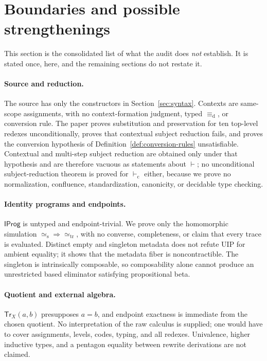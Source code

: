 \documentclass[10pt,reqno]{amsart}
\newcommand{\Tr}{\mathsf{Tr}}
\newcommand{\TrEq}{\mathrel{\simeq_{\mathrm{tr}}}}
\newcommand{\IProg}{\mathsf{IProg}}
\newcommand{\defeq}{\mathrel{\equiv_{\mathrm d}}}
\newcommand{\vdashC}{\vdash_{\mathrm{c}}}
\newcommand{\srweq}{\mathrel{\simeq_{\mathrm s}}}
\begin{document}
\section{Boundaries and possible strengthenings}
\label{sec:limitations}

This section is the consolidated list of what the audit does \emph{not}
establish.  It is stated once, here, and the remaining sections do not restate
it.

\paragraph{Source and reduction.}
The source has only the constructors in Section~\ref{sec:syntax}.  Contexts
are same-scope assignments, with no context-formation judgment, typed
\(\defeq\), or conversion rule.  The paper proves substitution and
preservation for ten top-level redexes unconditionally, proves that contextual
subject reduction fails, and proves the conversion hypothesis of
Definition~\ref{def:conversion-rules} unsatisfiable.  Contextual and
multi-step subject reduction are obtained only under that hypothesis and are
therefore vacuous as statements about \(\vdash\); no unconditional
subject-reduction theorem is proved for \(\vdashC\) either, because we prove
no normalization, confluence, standardization, canonicity, or decidable type
checking.

\paragraph{Identity programs and endpoints.}
\(\IProg\) is untyped and endpoint-trivial.  We prove only the homomorphic
simulation \(\srweq\Rightarrow\TrEq\), with no converse, completeness, or
claim that every trace is evaluated.  Distinct empty and singleton metadata
does not refute UIP for ambient equality; it shows that the metadata fiber is
noncontractible.  The singleton is intrinsically composable, so
composability alone cannot produce an unrestricted based eliminator
satisfying propositional beta.

\paragraph{Quotient and external algebra.}
\(\Tr_X(a,b)\) presupposes \(a=b\), and endpoint exactness is immediate from
the chosen quotient.  No interpretation of the raw calculus is supplied; one
would have to cover assignments, levels, codes, typing, and all redexes.
Univalence, higher inductive types, and a pentagon equality between rewrite
derivations are not claimed.
\end{document}
